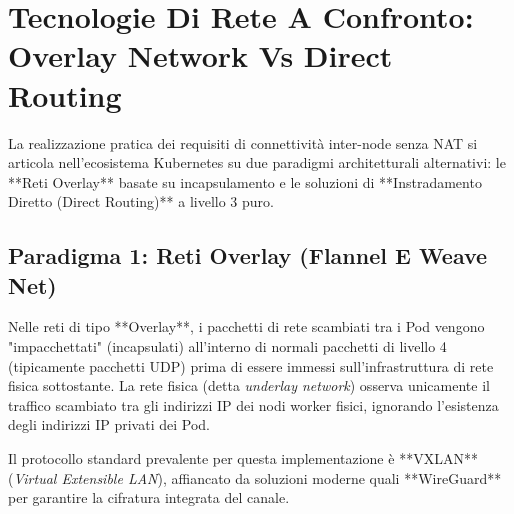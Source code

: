 \documentclass[11pt, a4paper]{article}
\begin{document}
\section{Tecnologie Di Rete A Confronto: Overlay Network Vs Direct Routing}

La realizzazione pratica dei requisiti di connettività inter-node senza NAT si articola nell'ecosistema Kubernetes su due paradigmi architetturali alternativi: le **Reti Overlay** basate su incapsulamento e le soluzioni di **Instradamento Diretto (Direct Routing)** a livello 3 puro.


\subsection{Paradigma 1: Reti Overlay (Flannel E Weave Net)}

Nelle reti di tipo **Overlay**, i pacchetti di rete scambiati tra i Pod vengono "impacchettati" (incapsulati) all'interno di normali pacchetti di livello 4 (tipicamente pacchetti UDP) prima di essere immessi sull'infrastruttura di rete fisica sottostante. La rete fisica (detta \emph{underlay network}) osserva unicamente il traffico scambiato tra gli indirizzi IP dei nodi worker fisici, ignorando l'esistenza degli indirizzi IP privati dei Pod.

Il protocollo standard prevalente per questa implementazione è **VXLAN** (\emph{Virtual Extensible LAN}), affiancato da soluzioni moderne quali **WireGuard** per garantire la cifratura integrata del canale.
\end{document}
